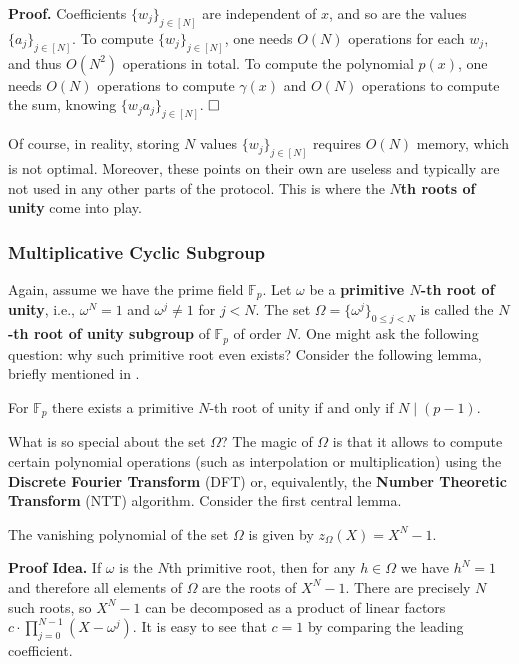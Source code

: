 \documentclass[../lecture-notes.tex]{subfiles}
\begin{document}
\textbf{Proof.} Coefficients $\{w_j\}_{j \in [N]}$ are independent of $x$, and so 
are the values $\{a_j\}_{j \in [N]}$. To compute $\{w_j\}_{j \in [N]}$, one needs 
$O(N)$ operations for each $w_j$, and thus $O(N^2)$ operations in total. To compute
the polynomial $p(x)$, one needs $O(N)$ operations to compute $\gamma(x)$ and 
$O(N)$ operations to compute the sum, knowing $\{w_ja_j\}_{j \in [N]}$. $\hfill\Box$

Of course, in reality, storing $N$ values $\{w_j\}_{j \in [N]}$ requires $O(N)$
memory, which is not optimal. Moreover, these points on their own are useless 
and typically are not used in any other parts of the protocol. This is where the
\textbf{$N$th roots of unity} come into play.

\subsubsection{Multiplicative Cyclic Subgroup}\label{section:mult-cyclic-g}

Again, assume we have the prime field $\mathbb{F}_p$. Let $\omega$ be a
\textbf{primitive $N$-th root of unity}, i.e., $\omega^N = 1$ and $\omega^j \neq
1$ for $j < N$. The set $\Omega = \{\omega^j\}_{0 \le j < N}$ is called
the \textbf{$N$-th root of unity subgroup} of $\mathbb{F}_p$ of order $N$. One
might ask the following question: why such primitive root even exists? Consider
the following lemma, briefly mentioned in
.

\begin{lemma}
    For $\mathbb{F}_p$ there exists a primitive $N$-th root of unity
    if and only if $N \mid (p-1)$. 
\end{lemma}
What is so special about the set $\Omega$? The magic of $\Omega$ is that it
allows to compute certain polynomial operations (such as interpolation or
multiplication) using the \textbf{Discrete Fourier Transform} (DFT) or, 
equivalently, the \textbf{Number Theoretic Transform} (NTT) algorithm. 
Consider the first central lemma.

\begin{lemma}\label{lemma:vanishing-polynomial}
    The vanishing polynomial of the set $\Omega$ is given by $z_{\Omega}(X) = X^N - 1$.
\end{lemma}

\textbf{Proof Idea.} If $\omega$ is the $N$th primitive root, then for any $h
\in \Omega$ we have $h^N = 1$ and therefore all elements of $\Omega$ are the
roots of $X^N-1$. There are precisely $N$ such roots, so $X^N-1$ can be 
decomposed as a product of linear factors $c \cdot \prod_{j=0}^{N-1}(X-\omega^j)$. 
It is easy to see that $c=1$ by comparing the leading coefficient. 
\end{document}
